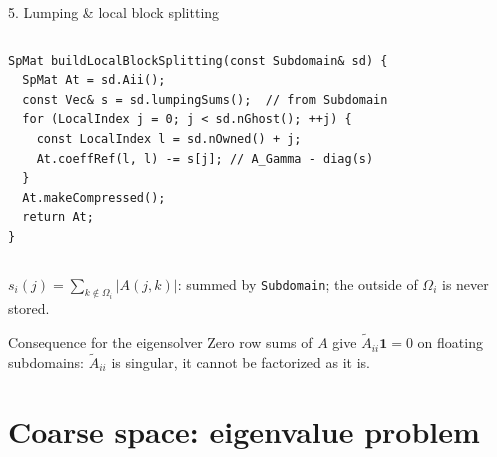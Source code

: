 \documentclass[aspectratio=169,10pt]{beamer}
\newcommand{\code}[1]{\texttt{#1}}
\newcommand\Wlump{{1}{-44}{62}{-5.5}}
\newcommand\mapsec[2]{\expandafter\cmsection#1{#2}}
\newcommand\mapbadge[1]{%
  \begin{tikzpicture}[remember picture,overlay]
    \node[anchor=north east,fill=white,rounded corners=1.2pt,inner sep=0.9pt]
      at ($(current page.north east)+(-1.8mm,-0.75mm)$) {\expandafter\cmthumb#1{17mm}};
  \end{tikzpicture}}
\begin{document}
\begin{frame}[fragile]{5. Lumping \& local block splitting}
  \begin{columns}[T,onlytextwidth]
\begin{lstlisting}
SpMat buildLocalBlockSplitting(const Subdomain& sd) {
  SpMat At = sd.Aii();
  const Vec& s = sd.lumpingSums();  // from Subdomain
  for (LocalIndex j = 0; j < sd.nGhost(); ++j) {
    const LocalIndex l = sd.nOwned() + j;
    At.coeffRef(l, l) -= s[j]; // A_Gamma - diag(s)
  }
  At.makeCompressed();
  return At;
}
\end{lstlisting}
    \centering
    \mapsec\Wlump{0.98\linewidth}\\[2mm]
  
  \end{columns}
  
  \small  
  $s_i(j)=\sum_{k\notin\Omega_i}|A(j,k)|$: summed by \code{Subdomain}; the outside of $\Omega_i$ is never stored.

  \begin{block}{Consequence for the eigensolver}
    \small Zero row sums of $A$ give $\widetilde A_{ii}\mathbf{1}=0$ on
    floating subdomains: $\widetilde A_{ii}$ is \alert{singular}, it cannot be factorized as it is.
  \end{block}          
\end{frame}

\section{Coarse space: eigenvalue problem}
\end{document}
